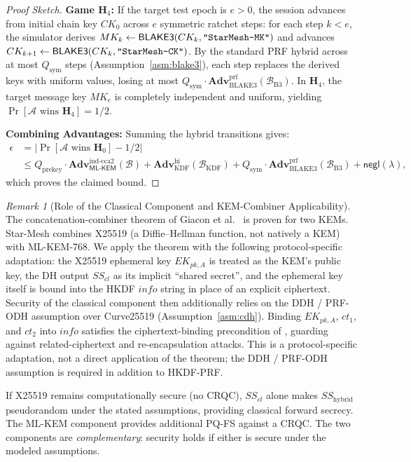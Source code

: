 \documentclass[11pt,a4paper]{article}
\theoremstyle{remark}
\newtheorem{remark}[theorem]{Remark}
\theoremstyle{plain}
\newcommand{\negl}{\mathsf{negl}}
\newcommand{\Adv}{\mathbf{Adv}}
\newcommand{\calA}{\mathcal{A}}
\newcommand{\calB}{\mathcal{B}}
\newcommand{\MLKEM}{\mathsf{ML\text{-}KEM}}
\newcommand{\strlit}[1]{\text{\upshape\texttt{"#1"}}}
\newcommand{\Hgame}[1]{\mathbf{H}_{#1}}
\begin{document}
\begin{proof}[Proof Sketch]
\medskip\noindent
\textbf{Game $\Hgame{4}$:} If the target test epoch is $e > 0$, the session advances from initial chain key $CK_0$ across $e$ symmetric ratchet steps: for each step $k < e$, the simulator derives $MK_k \gets \mathsf{BLAKE3}(CK_k, \strlit{StarMesh-MK})$ and advances $CK_{k+1} \gets \mathsf{BLAKE3}(CK_k, \strlit{StarMesh-CK})$.
By the standard PRF hybrid across at most $Q_{\mathrm{sym}}$ steps (Assumption~\ref{asm:blake3}), each step replaces the derived keys with uniform values, losing at most $Q_{\mathrm{sym}} \cdot \Adv^{\mathrm{prf}}_{\mathrm{BLAKE3}}(\mathcal{B}_{\mathrm{B3}})$.
In $\Hgame{4}$, the target message key $MK_e$ is completely independent and uniform, yielding $\Pr[\calA\text{ wins }\Hgame{4}] = 1/2$.

\medskip\noindent
\textbf{Combining Advantages:} Summing the hybrid transitions gives:
\[
\begin{aligned}
  \epsilon &= |\Pr[\calA\text{ wins }\Hgame{0}] - 1/2| \\
           &\leq Q_{\mathrm{prekey}} \cdot \Adv^{\mathrm{ind\text{-}cca2}}_{\MLKEM}(\calB)
                + \Adv^{\mathrm{hi}}_{\mathrm{KDF}}(\mathcal{B}_{\mathrm{KDF}})
                + Q_{\mathrm{sym}} \cdot \Adv^{\mathrm{prf}}_{\mathrm{BLAKE3}}(\mathcal{B}_{\mathrm{B3}})
                + \negl(\lambda),
\end{aligned}
\]
which proves the claimed bound.
\end{proof}

\begin{remark}[Role of the Classical Component and KEM-Combiner Applicability]
\label{rem:combiner}
The concatenation-combiner theorem of Giacon et al.\ \cite{giacon2018kem} is proven for two
KEMs.  Star-Mesh combines X25519 (a Diffie--Hellman function, not natively a KEM) with
ML-KEM-768.  We apply the theorem with the following protocol-specific adaptation: the X25519
ephemeral key $EK_{pk,A}$ is treated as the KEM's public key, the DH output $SS_{cl}$ as its
implicit ``shared secret'', and the ephemeral key itself is bound into the HKDF $info$ string
in place of an explicit ciphertext.  Security of the classical component then additionally
relies on the DDH / PRF-ODH assumption over Curve25519 (Assumption~\ref{asm:cdh}).  Binding $EK_{pk,A}$, $ct_1$, and $ct_2$ into
$info$ satisfies the ciphertext-binding precondition of \cite{giacon2018kem}, guarding against
related-ciphertext and re-encapsulation attacks.  This is a protocol-specific adaptation, not a
direct application of the theorem; the DDH / PRF-ODH assumption is required in addition to HKDF-PRF.

If X25519 remains computationally secure (no CRQC), $SS_{cl}$ alone makes $SS_{\text{hybrid}}$
pseudorandom under the stated assumptions, providing classical forward secrecy.  The ML-KEM
component provides additional PQ-FS against a CRQC.  The two components are
\emph{complementary}: security holds if either is secure under the modeled assumptions.
\end{remark}
\end{document}
